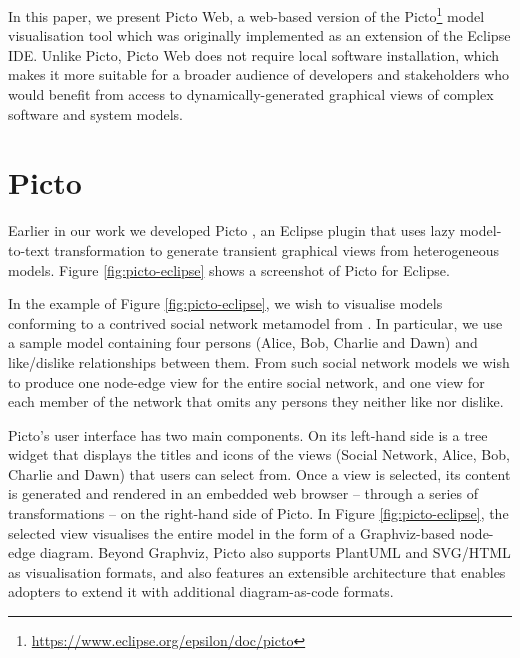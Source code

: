 \documentclass[sigconf,review]{acmart}
\begin{document}
In this paper, we present Picto Web, a web-based version of the Picto\footnote{\url{https://www.eclipse.org/epsilon/doc/picto}} \cite{dimitris2020picto} model visualisation tool which was originally implemented as an extension of the Eclipse IDE. Unlike Picto, Picto Web does not require local software installation, which makes it more suitable for a broader audience of developers and stakeholders who would benefit from access to dynamically-generated graphical views of complex software and system models.

\section{Picto}
\label{sec:picto}

Earlier in our work we developed Picto \cite{dimitris2020picto}, an Eclipse plugin that uses lazy model-to-text transformation to generate transient graphical views from heterogeneous models. Figure \ref{fig:picto-eclipse} shows a screenshot of Picto for Eclipse.

In the example of Figure \ref{fig:picto-eclipse}, we wish to visualise models conforming to a contrived social network metamodel from \cite{dimitris2020picto}. In particular, we use a sample model containing four persons (Alice, Bob,  Charlie and Dawn) and like/dislike relationships between them. From such social network models we wish to produce one node-edge view for the entire social network, and one view for each member of the network that omits any persons they neither like nor dislike. 

Picto’s user interface has two main components. On its left-hand side is a tree widget that displays the titles and icons of the views (Social Network, Alice, Bob, Charlie and Dawn) that users can select from. Once a view is selected, its content is generated and rendered in an embedded web browser -- through a series of transformations -- on the right-hand side of Picto. In Figure \ref{fig:picto-eclipse}, the selected view visualises the entire model in the form of a Graphviz-based node-edge diagram. Beyond Graphviz, Picto also supports PlantUML and SVG/HTML as visualisation formats, and also features an extensible architecture that enables adopters to extend it with additional diagram-as-code formats.  
\end{document}
